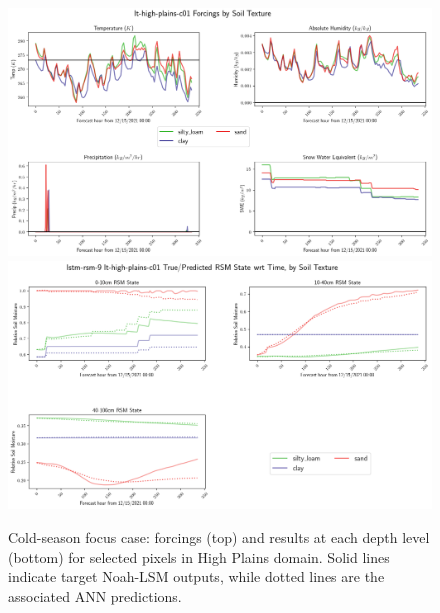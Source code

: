 \begin{figure}[h!p]
    \centering

    \includegraphics[width=.98\linewidth,draft=false]{figures/lt-high-plains/eval-grid_lt-high-plains-c01_lstm-rsm-9_rsm_keep-all_bias_forcings.png}
    \includegraphics[width=.98\linewidth,draft=false]{figures/lt-high-plains/eval-grid_lt-high-plains-c01_lstm-rsm-9_rsm_keep-all_bias_state-seq-textures-all.png}

    \caption{Cold-season focus case: forcings (top) and results at each depth level (bottom) for selected pixels in High Plains domain. Solid lines indicate target Noah-LSM outputs, while dotted lines are the associated ANN predictions.}
    \label{lt_sequence-c01_high-plains}
\end{figure}

